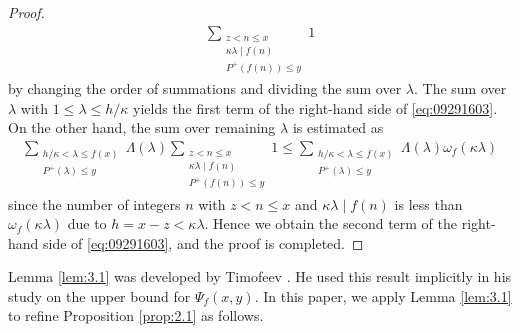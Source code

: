 \documentclass[a4paper,11pt]{amsart}
\theoremstyle{definition}
\numberwithin{equation}{section}
\begin{document}
\begin{proof}
\begin{align*}
\sum_{\substack{z<n \leq x \\ \kappa \lambda \mid f(n) \\ P^+(f(n)) \leq y}}  1
\end{align*}
by changing the order of summations and dividing the sum over $\lambda$. 
The sum over $\lambda$ with $1 \leq \lambda \leq h/\kappa$ yields the first term of the right-hand side of \eqref{eq:09291603}. 
On the other hand, the sum over remaining $\lambda$ is estimated as
\begin{align*}
\sum_{\substack{h/\kappa < \lambda \leq f(x) \\ P^+(\lambda) \leq y}} \Lambda(\lambda)
\sum_{\substack{z<n \leq x \\ \kappa \lambda \mid f(n) \\ P^+(f(n)) \leq y}}  1
\leq \sum_{\substack{h/\kappa < \lambda \leq f(x) \\ P^+(\lambda) \leq y}} \Lambda(\lambda)
\omega_f(\kappa \lambda)
\end{align*}
since the number of integers $n$ with $z<n \leq x$ and $\kappa \lambda \mid f(n)$ is less than $\omega_f(\kappa \lambda)$ due to $h=x-z< \kappa \lambda$. 
Hence we obtain the second term of the right-hand side of \eqref{eq:09291603}, and the proof is completed. 
\end{proof}

Lemma \ref{lem:3.1} was developed by Timofeev \cite{Timofeev1977}. 
He used this result implicitly in his study on the upper bound for $\Psi_f(x,y)$. 
In this paper, we apply Lemma \ref{lem:3.1} to refine Proposition \ref{prop:2.1} as follows. 
\end{document}
